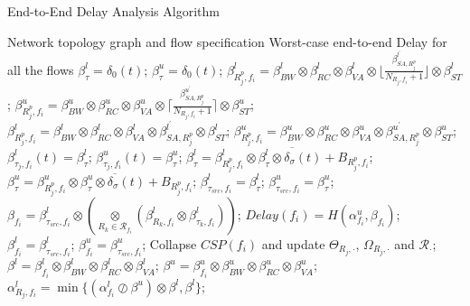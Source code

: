 \documentclass[10pt,journal]{IEEEtran}
\begin{document}
\begin{algorithm}
\caption{End-to-End Delay Analysis Algorithm}
\label{alg:equivalentservicecurve}
\begin{algorithmic}[1]
\REQUIRE Network topology graph and flow specification
\ENSURE Worst-case end-to-end Delay for all the flows
        \STATE $\beta_{\tau}^l=\delta_0(t)$; $\beta_{\tau}^u=\delta_0(t)$;
                \STATE $\beta_{R_j^{p},f_i}^l=\beta_{BW}^l\otimes\beta_{RC}^l\otimes\beta_{VA}^l\otimes\lfloor\frac{\beta_{SA,R_j^{p}}^{l^\prime}}{N_{R_j,f_i}+1}\rfloor\otimes\beta_{ST}^l$;
                \STATE $\beta_{R_j^{p},f_i}^u=\beta_{BW}^u\otimes\beta_{RC}^u\otimes\beta_{VA}^u\otimes\lceil\frac{\beta_{SA,R_j^{p}}^{u^\prime}}{N_{R_j,f_i}+1}\rceil\otimes\beta_{ST}^u$;
            \ELSE
                \STATE $\beta_{R_j^{p},f_i}^l=\beta_{BW}^l\otimes\beta_{RC}^l\otimes\beta_{VA}^l\otimes\beta_{SA,R_j^{p}}^{l^\prime}\otimes\beta_{ST}^l$;
                \STATE $\beta_{R_j^{p},f_i}^u=\beta_{BW}^u\otimes\beta_{RC}^u\otimes\beta_{VA}^u\otimes\beta_{SA,R_j^{p}}^{u^\prime}\otimes\beta_{ST}^u$;
            \ENDIF
            \STATE $\beta^{l}_{\tau_j,f_i}(t)=\beta_{\tau}^l$; $\beta^{u}_{\tau_j,f_i}(t)=\beta_{\tau}^u$;
            \STATE $\beta_{\tau}^l=\overline{\beta^l_{R_j^{p},f_i}\otimes\beta^{l}_{\tau}\otimes\delta_\sigma(t)+B_{R_j^{p},f_i}}$;
            \STATE $\beta_{\tau}^u=\overline{\beta^u_{R_j^{p},f_i}\otimes\beta^{u}_{\tau}\otimes\delta_\sigma(t)+B_{R_j^{p},f_i}}$;
        \ENDFOR
        \STATE $\beta_{\tau_{src},f_i}^l=\beta^l_{\tau}$; $\beta_{\tau_{src},f_i}^u=\beta^u_{\tau}$;
        \STATE $\beta_{f_i}=\beta_{\tau_{src},f_i}^l\otimes (\underset{R_k\in\mathcal{R}_{f_i}}{\otimes}(\beta^l_{R_k,f_i}\otimes\beta^l_{\tau_k,f_i}))$;
        \STATE $Delay(f_i)=H(\alpha^u_{f_i},\beta_{f_i})$;
        \STATE $\beta_{f_i}^l=\beta_{\tau_{src},f_i}^l$; $\beta_{f_i}^u=\beta_{\tau_{src},f_i}^u$;
        \STATE Collapse $CSP(f_i)$ and update $\Theta_{R_j,\cdot}$, $\Omega_{R_j,\cdot}$ and $\mathcal{R}_{\cdot}$;
                \STATE $\beta^l=\beta^l_{f_i}\otimes\beta_{BW}^l\otimes\beta_{RC}^l\otimes\beta_{VA}^l$;
                \STATE $\beta^u=\beta^u_{f_i}\otimes\beta_{BW}^u\otimes\beta_{RC}^u\otimes\beta_{VA}^u$;
                \STATE $\alpha^l_{R_j,f_i}=\min\{(\alpha^l_{f_i}\oslash\beta^u)\otimes\beta^l,\beta^l\}$;

\end{algorithmic}
\end{algorithm}
\end{document}
